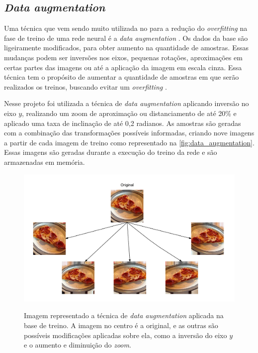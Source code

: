 \subsection{\textit{Data augmentation}}
Uma técnica que vem sendo muito utilizada no para a redução do \textit{overfitting} na fase de treino de uma rede neural é a \textit{data augmentation} \cite{cui2015data}. 
Os dados da base são ligeiramente modificados, para obter aumento na quantidade de amostras.
Essas mudanças podem ser inversões nos eixos, pequenas rotações, aproximações em certas partes das imagens ou até a aplicação da imagem em escala cinza.
Essa técnica tem o propósito de aumentar a quantidade de amostras em que serão realizados os treinos, buscando evitar um \textit{overfitting} \cite{imaginetArticle}.
\par Nesse projeto foi utilizada a técnica de \textit{data augmentation} aplicando inversão no eixo $y$, realizando um zoom de aproximação ou distanciamento de até 20\% e aplicado uma taxa de inclinação de até 0,2 radianos. As amostras são geradas com a combinação das transformações possíveis informadas, criando nove imagens a partir de cada imagem de treino como representado na \autoref{fig:data_augmentation}. Essas imagens são geradas durante a execução do treino da rede e são armazenadas em memória.

\begin{figure}[H]
  \centering
  \caption{Imagem representado a técnica de \textit{data augmentation} aplicada na base de treino. A imagem no centro é a original, e as outras são possíveis modificações aplicadas sobre ela, como a inversão do eixo $y$ e o aumento e diminuição do \textit{zoom}.}
  \includegraphics[width=500pt]{dados/figuras/data_augmentation}
  \label{fig:data_augmentation}
\end{figure}

